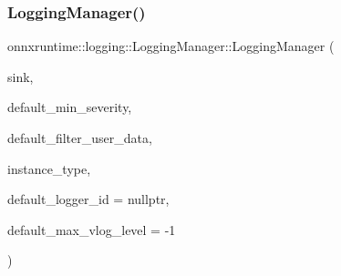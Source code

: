 \subsubsection{\texorpdfstring{Logging\+Manager()}{LoggingManager()}}
{\footnotesize\ttfamily onnxruntime\+::logging\+::\+Logging\+Manager\+::\+Logging\+Manager (\begin{DoxyParamCaption}\item[{std\+::unique\+\_\+ptr$<$ \mbox{\hyperlink{classonnxruntime_1_1logging_1_1ISink}{I\+Sink}} $>$}]{sink,  }\item[{\mbox{\hyperlink{namespaceonnxruntime_1_1logging_a7daeb33e1b0e6a6df8c23d142af78e81}{Severity}}}]{default\+\_\+min\+\_\+severity,  }\item[{bool}]{default\+\_\+filter\+\_\+user\+\_\+data,  }\item[{\mbox{\hyperlink{classonnxruntime_1_1logging_1_1LoggingManager_af3489102aaa98cc9b30fcd5ac641eef6}{Instance\+Type}}}]{instance\+\_\+type,  }\item[{const std\+::string $\ast$}]{default\+\_\+logger\+\_\+id = {\ttfamily nullptr},  }\item[{int}]{default\+\_\+max\+\_\+vlog\+\_\+level = {\ttfamily -\/1} }\end{DoxyParamCaption})}

